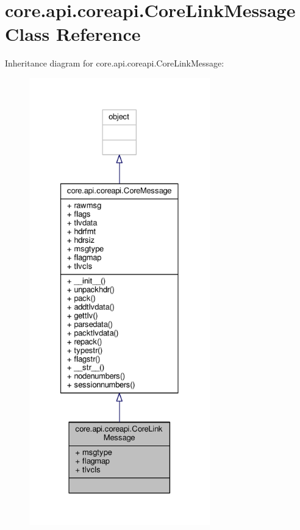 \hypertarget{classcore_1_1api_1_1coreapi_1_1_core_link_message}{\section{core.\+api.\+coreapi.\+Core\+Link\+Message Class Reference}
\label{classcore_1_1api_1_1coreapi_1_1_core_link_message}
}


Inheritance diagram for core.\+api.\+coreapi.\+Core\+Link\+Message\+:
\nopagebreak
\begin{figure}[H]
\begin{center}
\leavevmode
\includegraphics[height=550pt]{classcore_1_1api_1_1coreapi_1_1_core_link_message__inherit__graph}
\end{center}
\end{figure}


